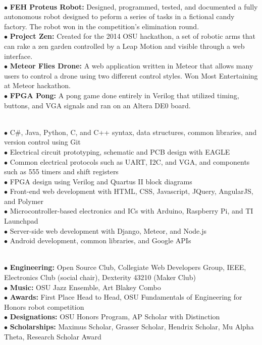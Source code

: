 \documentclass[10pt]{article}
\begin{document}
\\
$\bullet$ {\bf FEH Proteus Robot:} Designed, programmed, tested, and documented a fully autonomous robot designed to peform a series of tasks in a fictional candy factory. The robot won in the competition's elimination round.\\
$\bullet$ {\bf Project Zen:} Created for the 2014 OSU hackathon, a set of robotic arms that can rake a zen garden controlled by a Leap Motion and visible through a web interface.\\
$\bullet$ {\bf Meteor Flies Drone:} A web application written in Meteor that allows many users to control a drone using two different control styles. Won Most Entertaining at Meteor hackathon.\\
$\bullet$ {\bf FPGA Pong:} A pong game done entirely in Verilog that utilized timing, buttons, and VGA signals and ran on an Altera DE0 board.
\medskip

\\
$\bullet$ C\#, Java, Python, C, and C++ syntax, data structures, common libraries, and version control using Git\\
$\bullet$ Electrical circuit prototyping, schematic and PCB design with EAGLE\\
$\bullet$ Common electrical protocols such as UART, I2C, and VGA, and components such as 555 timers and shift registers\\
$\bullet$ FPGA design using Verilog and Quartus II block diagrams\\
$\bullet$ Front-end web development with HTML, CSS, Javascript, JQuery, AngularJS, and Polymer\\
$\bullet$ Microcontroller-based electronics and ICs with Arduino, Raspberry Pi, and TI Launchpad\\
$\bullet$ Server-side web development with Django, Meteor, and Node.js\\
$\bullet$ Android development, common libraries, and Google APIs
\medskip

\\
$\bullet$ {\bf Engineering:} Open Source Club, Collegiate Web Developers Group, IEEE, Electronics Club (social chair), Dexterity 43210 (Maker Club)\\
$\bullet$ {\bf Music:} OSU Jazz Ensemble, Art Blakey Combo\\
$\bullet$ {\bf Awards:} First Place Head to Head, OSU Fundamentals of Engineering for Honors robot competition\\
$\bullet$ {\bf Designations:} OSU Honors Program, AP Scholar with Distinction\\
$\bullet$ {\bf Scholarships:} Maximus Scholar, Grasser Scholar, Hendrix Scholar, Mu Alpha Theta, Research Scholar Award
\medskip
\end{document}

